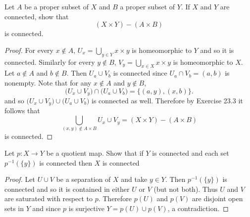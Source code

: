 \begin{ex}{23.9}
    Let $A$ be a proper subset of $X$ and $B$ a proper subset of $Y$. 
    If $X$ and $Y$ are connected, show that
    $$\left(X\times Y\right)-\left(A\times B\right)$$
    is connected.
\end{ex}
\begin{proof}
    For every $x\not\in A$, $U_x =\bigcup_{y\in Y} x\times y$ is homeomorphic to $Y$ and so it is connected. 
    Similarly for every $y\not\in B$, $V_y=\bigcup_{x\in X} x\times y$ is homeomorphic to $X$.
    Let $a\not\in A$ and $b\not\in B$. 
    Then $U_a\cup V_b$ is connected since $U_a\cap V_b=(a,b)$ is nonempty.
    Note that for any $x\not\in A$ and $y\not\in B$, 
    $$\big(U_x\cup V_y\big)\cap\big(U_a\cup V_b\big)=\{(a,y), (x, b)\}.$$
    and so $\big(U_x\cup V_y\big)\cup\big(U_a\cup V_b\big)$ is connected as well.
    Therefore by Exercise 23.3 it follows that 
    $$\bigcup_{(x,y)\not\in A\times B} U_x\cup V_y = \left(X\times Y\right)-\left(A\times B\right)$$
    is connected.
\end{proof}

\begin{ex}{23.11}
    Let $p:X\to Y$ be a quotient map. Show that if $Y$ is connected and each set $p^{-1}(\{y\})$ is connected
    then $X$ is connected
\end{ex}
\begin{proof}
    Let $U\cup V$ be a separation of $X$ and take $y\in Y$. Then $p^{-1}(\{y\})$ is connected and so it is contained in either $U$ or $V$ (but not both). 
    Thus $U$ and $V$ are saturated with respect to $p$. Therefore $p(U)$ and $p(V)$ are disjoint open sets in $Y$ and since $p$ is surjective
    $Y=p(U)\cup p(V)$, a contradiction.
\end{proof}